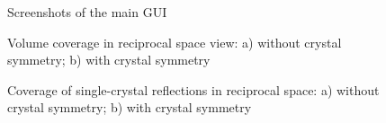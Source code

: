 \documentclass{iucr}              %
\begin{document}
  
\begin{figure}
\caption{Screenshots of the main GUI}
\label{fig:screenshots}
\end{figure}
 



\begin{figure}
\caption{Volume coverage in reciprocal space view: a) without crystal symmetry;
b) with crystal symmetry}
\label{fig:volume_view}
\end{figure}


\begin{figure}
\caption{Coverage of single-crystal reflections in reciprocal space: a) without
crystal symmetry; b) with crystal symmetry}
\label{fig:refl_view}
\end{figure}
\end{document}

